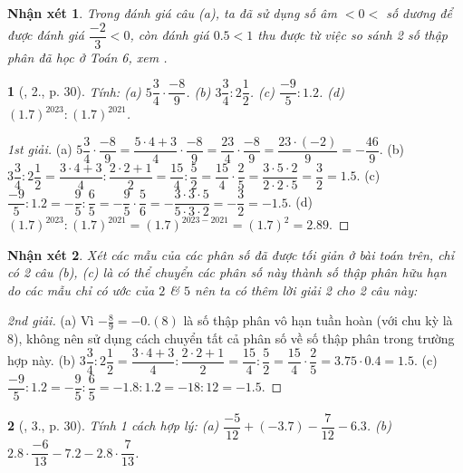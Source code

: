 \documentclass{article}
\newtheorem{baitoan}{}
\newtheorem{nhanxet}{Nhận xét}
\begin{document}
\begin{nhanxet}
	Trong đánh giá câu (a), ta đã sử dụng số âm $< 0 < $ số dương để được đánh giá $\dfrac{-2}{3} < 0$, còn đánh giá $0.5 < 1$ thu được từ việc so sánh 2 số thập phân đã học ở Toán 6, xem {\rm\cite[\S5, Sect. II: So sánh các số thập phân, pp. 45--47]{SGK_Toan_6_Canh_Dieu_tap_2}}.
\end{nhanxet}

\begin{baitoan}[\cite{SGK_Toan_7_Canh_Dieu_tap_1}, 2., p. 30]
	Tính: (a) $5\dfrac{3}{4}\cdot\dfrac{-8}{9}$. (b) $3\dfrac{3}{4}:2\dfrac{1}{2}$. (c) $\dfrac{-9}{5}:1.2$. (d) $(1.7)^{2023}:(1.7)^{2021}$.
\end{baitoan}

\begin{proof}[1st giải]
	(a) $5\dfrac{3}{4}\cdot\dfrac{-8}{9} = \dfrac{5\cdot4 + 3}{4}\cdot\dfrac{-8}{9} = \dfrac{23}{4}\cdot\dfrac{-8}{9} = \dfrac{23\cdot(-2)}{9} = -\dfrac{46}{9}$. (b) $3\dfrac{3}{4}:2\dfrac{1}{2} = \dfrac{3\cdot4 + 3}{4}:\dfrac{2\cdot2 + 1}{2} = \dfrac{15}{4}:\dfrac{5}{2} = \dfrac{15}{4}\cdot\dfrac{2}{5} = \dfrac{3\cdot5\cdot2}{2\cdot2\cdot5} = \dfrac{3}{2} = 1.5$. (c) $\dfrac{-9}{5}:1.2 = -\dfrac{9}{5}:\dfrac{6}{5} = -\dfrac{9}{5}\cdot\dfrac{5}{6} = -\dfrac{3\cdot3\cdot5}{5\cdot3\cdot2} = -\dfrac{3}{2} = -1.5$. (d) $(1.7)^{2023}:(1.7)^{2021} = (1.7)^{2023 - 2021} = (1.7)^2 = 2.89$.
\end{proof}

\begin{nhanxet}
	Xét các mẫu của các phân số đã được tối giản ở bài toán trên, chỉ có 2 câu (b), (c) là có thể chuyển các phân số này thành số thập phân hữu hạn do các mẫu chỉ có ước của $2$ \& $5$ nên ta có thêm lời giải 2 cho 2 câu này:
\end{nhanxet}

\begin{proof}[2nd giải]
	(a) Vì $-\frac{8}{9} = -0.(8)$ là số thập phân vô hạn tuần hoàn (với chu kỳ là 8), không nên sử dụng cách chuyển tất cả phân số về số thập phân trong trường hợp này. (b) $3\dfrac{3}{4}:2\dfrac{1}{2} = \dfrac{3\cdot4 + 3}{4}:\dfrac{2\cdot2 + 1}{2} = \dfrac{15}{4}:\dfrac{5}{2} = \dfrac{15}{4}\cdot\dfrac{2}{5} = 3.75\cdot0.4 = 1.5$. (c) $\dfrac{-9}{5}:1.2 = -\dfrac{9}{5}:\dfrac{6}{5} = -1.8:1.2 = -18:12 = -1.5$.
\end{proof}

\begin{baitoan}[\cite{SGK_Toan_7_Canh_Dieu_tap_1}, 3., p. 30]
	Tính 1 cách hợp lý: (a) $\dfrac{-5}{12} + (-3.7) - \dfrac{7}{12} - 6.3$. (b) $2.8\cdot\dfrac{-6}{13} - 7.2 - 2.8\cdot\dfrac{7}{13}$.
\end{baitoan}
\end{document}
